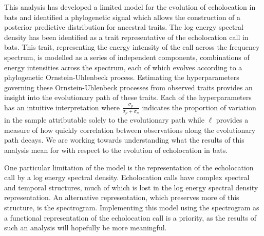 \documentclass[wsdraft]{ws-rv9x6} %
\begin{document}
This analysis has developed a limited model for the evolution of echolocation in bats and identified a phylogenetic signal which allows the construction of a posterior predictive distribution for ancestral traits. The log energy spectral density has been identified as a trait representative of the echolocation call in bats. This trait, representing the energy intensity of the call across the frequency spectrum, is modelled as a series of independent components, combinations of energy intensities across the spectrum, each of which evolves according to a phylogenetic Ornstein-Uhlenbeck process. Estimating the hyperparameters governing these Ornstein-Uhlenbeck processes from observed traits provides an insight into the evolutionary path of these traits. Each of the hyperparameters has an intuitive interpretation where \(\frac{\sigma_p}{\sigma_p + \sigma_n}\) indicates the proportion of variation in the sample attributable solely to the evolutionary path while \(\ell\) provides a measure of how quickly correlation between observations along the evolutionary path decays. We are working towards understanding what the results of this analysis mean for with respect to the evolution of echolocation in bats.

One particular limitation of the model is the representation of the echolocation call by a log energy spectral density. Echolocation calls have complex spectral and temporal structures, much of which is lost in the log energy spectral density representation. An alternative representation, which preserves more of this structure, is the spectrogram. Implementing this model using the spectrogram as a functional representation of the echolocation call is a priority, as the results of such an analysis will hopefully be more meaningful.






\end{document}
